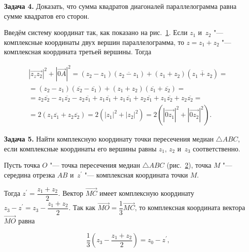 \textbf{Задача 4.}\label{ex:7_2_4} Доказать, что сумма квадратов диагоналей
параллелограмма равна сумме квадратов его сторон.

\begin{figure}\label{fig:7_2_17}
\end{figure}

Введём систему координат так, как показано на рис.\ \ref{fig:7_2_17}.
Если $z_{1}$ и~$z_{2}$ "--- комплексные координаты двух вершин параллелограмма,
то $z = z_{1} + z_{2}$ "--- комплексная координата третьей вершины.
Тогда

\begin{multline*}
|\overrightarrow{z_{z}z_{2}}|^{2} + |\overrightarrow{0A}|^{2} =
(z_{2} - z_{1})(\overline{z_{2} - z_{1}}) +
(z_{1} + z_{2})(\overline{z_{1} + z_{2}}) = \\
= (z_{2} - z_{1})(\overline{z_{2}} - \overline{z_{1}}) +
(z_{1} + z_{2})(\overline{z_{1}} + \overline{z_{2}}) = \\
= z_{2}\overline{z_{2}} - z_{1}\overline{z_{2}} - z_{2}\overline{z_{1}} +
z_{1}\overline{z_{1}} + z_{1}\overline{z_{1}} + z_{2}\overline{z_{1}} +
z_{1}\overline{z_{2}} + z_{2}\overline{z_{2}} = \\
	= 2\left( z_{1}\overline{z_{1}} + z_{2}\overline{z_{2}} \right) = 
2\left( |z_{1}|^{2} + |z_{2}|^{2} \right) =
2\left( |\overrightarrow{0z_{1}}|^{2} + |\overrightarrow{0z_{2}}|^{2} \right).
\end{multline*}

\textbf{Задача 5.}\label{ex:7_2_5} Найти комплексную координату точки пересечения медиан
$\triangle ABC$, если комплексные координаты его вершины равны $z_{1}$,
$z_{2}$ и~$z_{3}$ соответственно.

Пусть точка $O$ "--- точка пересечения медиан $\triangle ABC$
(рис.\ \ref{fig:7_2_18}), точка $M$ "--- середина отрезка $AB$
и~$z^\prime$ "--- комплексная координата точки $M$.

\begin{figure}\label{fig:7_2_18}
\end{figure}

\noindent
Тогда $z^\prime = \dfrac{z_{1} + z_{2}}{2}$. Вектор $\overrightarrow{MC}$
имеет комплексную координату
$z_{3} - z^\prime = z_{3} - \dfrac{z_{1} + z_{2}}{2}$.
Так как $\overrightarrow{MO} = \dfrac{1}{3}\overrightarrow{MC}$,
то комплексная координата вектора $\overrightarrow{MO}$ равна

\begin{equation*}
	\dfrac{1}{3} \left( z_{3} - \dfrac{z_{1} + z_{2}}{2} \right) =
	z_{0} - z^\prime,
\end{equation*}

